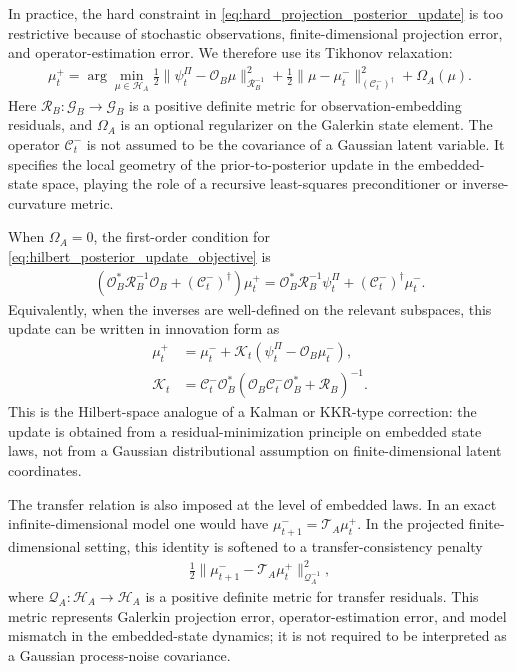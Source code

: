 \documentclass[twoside,11pt]{article}
\begin{document}
In practice, the hard constraint in
\eqref{eq:hard_projection_posterior_update} is too restrictive because
of stochastic observations, finite-dimensional projection error, and
operator-estimation error. We therefore use its Tikhonov relaxation:
\begin{align}
\mu_t^+
=
\arg\min_{\mu\in\mathcal H_A}
\frac12
\|\psi_t^\Pi-\mathcal O_B\mu\|_{\mathcal R_B^{-1}}^2
+
\frac12
\|\mu-\mu_t^-\|_{(\mathcal C_t^-)^\dagger}^2
+
\Omega_A(\mu).
\label{eq:hilbert_posterior_update_objective}
\end{align}
Here $\mathcal R_B:\mathcal G_B\to\mathcal G_B$ is a positive definite
metric for observation-embedding residuals, and
$\Omega_A$ is an optional regularizer on the Galerkin state element.
The operator $\mathcal C_t^-$ is not assumed to be the covariance of a
Gaussian latent variable. It specifies the local geometry of the
prior-to-posterior update in the embedded-state space, playing the role
of a recursive least-squares preconditioner or inverse-curvature metric.

When $\Omega_A=0$, the first-order condition for
\eqref{eq:hilbert_posterior_update_objective} is
\begin{align}
\left(
\mathcal O_B^\ast\mathcal R_B^{-1}\mathcal O_B
+
(\mathcal C_t^-)^\dagger
\right)
\mu_t^+
=
\mathcal O_B^\ast\mathcal R_B^{-1}\psi_t^\Pi
+
(\mathcal C_t^-)^\dagger \mu_t^-.
\label{eq:hilbert_posterior_normal_equation}
\end{align}
Equivalently, when the inverses are well-defined on the relevant
subspaces, this update can be written in innovation form as
\begin{align}
\mu_t^+
&=
\mu_t^-
+
\mathcal K_t
\left(
\psi_t^\Pi-\mathcal O_B\mu_t^-
\right),
\label{eq:hilbert_innovation_update}
\\
\mathcal K_t
&=
\mathcal C_t^- \mathcal O_B^\ast
\left(
\mathcal O_B \mathcal C_t^- \mathcal O_B^\ast
+
\mathcal R_B
\right)^{-1}.
\label{eq:hilbert_gain_operator}
\end{align}
This is the Hilbert-space analogue of a Kalman or KKR-type correction:
the update is obtained from a residual-minimization principle on
embedded state laws, not from a Gaussian distributional assumption on
finite-dimensional latent coordinates.

The transfer relation is also imposed at the level of embedded laws. In
an exact infinite-dimensional model one would have
$\mu_{t+1}^-=\mathcal T_A\mu_t^+$. In the projected finite-dimensional
setting, this identity is softened to a transfer-consistency penalty
\begin{align}
\frac12
\|\mu_{t+1}^- - \mathcal T_A\mu_t^+\|_{\mathcal Q_A^{-1}}^2,
\label{eq:hilbert_transfer_consistency}
\end{align}
where $\mathcal Q_A:\mathcal H_A\to\mathcal H_A$ is a positive definite
metric for transfer residuals. This metric represents Galerkin
projection error, operator-estimation error, and model mismatch in the
embedded-state dynamics; it is not required to be interpreted as a
Gaussian process-noise covariance.
\end{document}
